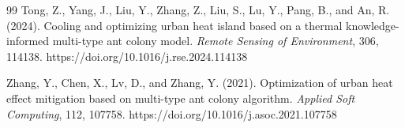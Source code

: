 \documentclass[11pt]{article}
\begin{document}
\begin{thebibliography}{99}
Tong, Z., Yang, J., Liu, Y., Zhang, Z., Liu, S., Lu, Y., Pang, B., and An, R. (2024).
Cooling and optimizing urban heat island based on a thermal knowledge-informed multi-type ant colony model.
\textit{Remote Sensing of Environment}, 306, 114138.
https://doi.org/10.1016/j.rse.2024.114138

Zhang, Y., Chen, X., Lv, D., and Zhang, Y. (2021).
Optimization of urban heat effect mitigation based on multi-type ant colony algorithm.
\textit{Applied Soft Computing}, 112, 107758.
https://doi.org/10.1016/j.asoc.2021.107758

\end{thebibliography}
\end{document}
